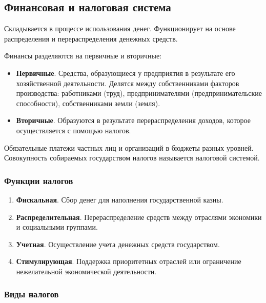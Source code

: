 \documentclass[12pt]{article}
\begin{document}
	\subsection{Финансовая и налоговая система}
	
	\begin{definition}
		Складывается в процессе использования денег. Функционирует на основе распределения и перераспределения денежных средств.
		
		Финансы разделяются на первичные и вторичные:
		\begin{itemize}
			\item \textbf{Первичные}. Средства, образующиеся у предприятия в результате его хозяйственной деятельности. Делятся между собственниками факторов производства: работниками (труд), предпринимателями (предпринимательские способности), собственниками земли (земля).
			\item \textbf{Вторичные}. Образуются в результате перераспределения доходов, которое осуществляется с помощью налогов.
		\end{itemize}
	\end{definition}
	
	\begin{definition}[Налоги]
		Обязательные платежи частных лиц и организаций в бюджеты разных уровней. Совокупность собираемых государством налогов называется налоговой системой.
	\end{definition}
	
	\subsubsection{Функции налогов}
	
	\begin{enumerate}
		\item \textbf{Фискальная}. Сбор денег для наполнения государственной казны.
		\item \textbf{Распределительная}. Перераспределение средств между отраслями экономики и социальными группами.
		\item \textbf{Учетная}. Осуществление учета денежных средств государством.
		\item \textbf{Стимулирующая}. Поддержка приоритетных отраслей или ограничение нежелательной экономической деятельности.
	\end{enumerate}
	
	\subsubsection{Виды налогов}
	
\end{document}
